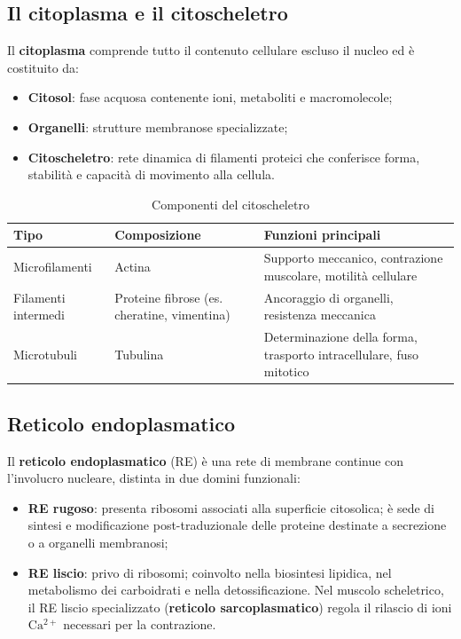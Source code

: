\documentclass[12pt,a4paper]{report}
\begin{document}
\subsection{Il citoplasma e il citoscheletro}
Il \textbf{citoplasma} comprende tutto il contenuto cellulare escluso il nucleo ed è costituito da:
\begin{itemize}
\item \textbf{Citosol}: fase acquosa contenente ioni, metaboliti e macromolecole;
\item \textbf{Organelli}: strutture membranose specializzate;
\item \textbf{Citoscheletro}: rete dinamica di filamenti proteici che conferisce forma, stabilità e capacità di movimento alla cellula.
\end{itemize}
\begin{table}[htbp]
\centering
\caption{Componenti del citoscheletro}
\label{tab:citoscheletro}
\renewcommand{\arraystretch}{1.2}
\begin{tabular}{@{} p{} p{} p{} @{}}
\toprule
\textbf{Tipo} & \textbf{Composizione} & \textbf{Funzioni principali} \\
\midrule
Microfilamenti & Actina & Supporto meccanico, contrazione muscolare, motilità cellulare \\
Filamenti intermedi & Proteine fibrose (es. cheratine, vimentina) & Ancoraggio di organelli, resistenza meccanica \\
Microtubuli & Tubulina & Determinazione della forma, trasporto intracellulare, fuso mitotico \\
\bottomrule
\end{tabular}
\end{table}
\subsection{Reticolo endoplasmatico}
Il \textbf{reticolo endoplasmatico} (RE) è una rete di membrane continue con l'involucro nucleare, distinta in due domini funzionali:
\begin{itemize}
\item \textbf{RE rugoso}: presenta ribosomi associati alla superficie citosolica; è sede di sintesi e modificazione post-traduzionale delle proteine destinate a secrezione o a organelli membranosi;
\item \textbf{RE liscio}: privo di ribosomi; coinvolto nella biosintesi lipidica, nel metabolismo dei carboidrati e nella detossificazione. Nel muscolo scheletrico, il RE liscio specializzato (\textbf{reticolo sarcoplasmatico}) regola il rilascio di ioni \(\mathrm{Ca^{2+}}\) necessari per la contrazione.
\end{itemize}
\end{document}

